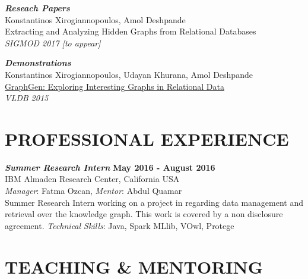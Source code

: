 \documentclass[margin, 10pt]{res} %
\begin{document}
\begin{resume}
{\sl \textbf{Reseach Papers}}\\
  Konstantinos Xirogiannopoulos, Amol Deshpande\\
  Extracting and Analyzing Hidden Graphs from Relational Databases\\
  \textit{SIGMOD 2017 [to appear]}

{\sl \textbf{Demonstrations} }\\
  Konstantinos Xirogiannopoulos, Udayan Khurana, Amol Deshpande\\
  \href{http://www.vldb.org/pvldb/vol8/p2032-xirogiannopoulos.pdf}{GraphGen: Exploring Interesting Graphs in Relational Data}\\
  \textit{VLDB 2015}


\section{PROFESSIONAL EXPERIENCE}


{\sl \textbf{Summer Research Intern} } \hfill \textbf{May 2016 - August 2016}\\
IBM Almaden Research Center, California USA\\
\textit{Manager}: Fatma Ozcan, \textit{Mentor}: Abdul Quamar\\
Summer Research Intern working on a project in regarding data management and retrieval over  the knowledge graph. This work is covered by a non disclosure agreement.
\textit{Technical Skills}: Java, Spark MLlib, VOwl, Protege


\section{TEACHING \& MENTORING}


\end{resume}
\end{document}
